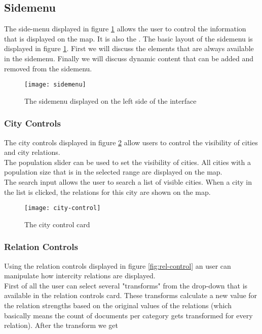 \subsection{Sidemenu}
The side-menu displayed in figure \ref{fig:sidemenu} allows the user to control the information that is displayed on the map. It is also the . The basic layout of the sidemenu is displayed in figure \ref{fig:sidemenu}. First we will discuss the elements that are always available in the sidemenu. Finally we will discuss dynamic content that can be added and removed from the sidemenu.

\begin{figure}[H]
    \centering
    \texttt{[image: sidemenu]}
    \caption{The sidemenu displayed on the left side of the interface}
    \label{fig:sidemenu}
\end{figure}


\subsubsection{City Controls}
The city controls displayed in figure \ref{fig:city-control} allow users to control the visibility of cities and city relations.\\
The population slider can be used to set the visibility of cities. All cities with a population size that is in the selected range are displayed on the map.\\
The search input allows the user to search a list of visible cities. When a city in the list is clicked, the relations for this city are shown on the map.

\begin{figure}[H]
    \centering
    \texttt{[image: city-control]}
    \caption{The city control card}
    \label{fig:city-control}
\end{figure}

\subsubsection{Relation Controls}
Using the relation controls displayed in figure \ref{fig:rel-control} an user can manipulate how intercity relations are displayed.\\
First of all the user can select several "transforms" from the drop-down that is available in the relation controls card. These transforms calculate a new value for the relation strengths based on the original values of the relations (which basically means the count of documents per category gets transformed for every relation). After the transform we get 


